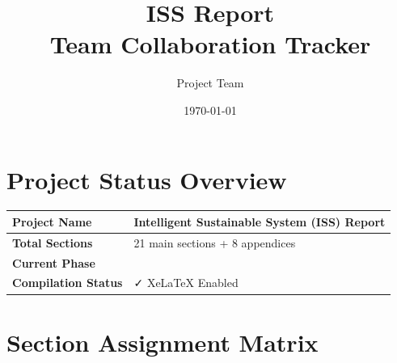 \documentclass[12pt]{article}
\title{\textbf{ISS Report\\Team Collaboration Tracker}}
\author{Project Team}
\date{\today}
\begin{document}
\maketitle

\section*{Project Status Overview}

\begin{tabular}{|l|l|}
\hline
\textbf{Project Name} & Intelligent Sustainable System (ISS) Report \\
\hline
\textbf{Total Sections} & 21 main sections + 8 appendices \\
\hline
\textbf{Current Phase} & \cellcolor{yellow}{IN PROGRESS} \\
\hline
\textbf{Compilation Status} & ✓ XeLaTeX Enabled \\
\hline
\end{tabular}

\vspace{1cm}

\section*{Section Assignment Matrix}
\end{document}
